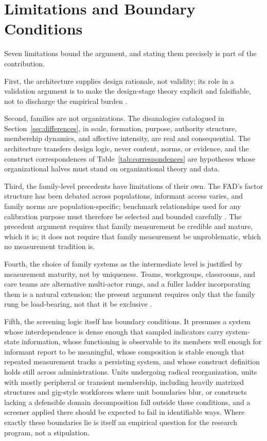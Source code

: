 \documentclass[12pt, letterpaper]{article}
\begin{document}
\section{Limitations and Boundary Conditions}
\label{sec:limitations}

Seven limitations bound the argument, and stating them precisely is part of the contribution.

First, the architecture supplies design rationale, not validity; its role in a validation argument is to make the design-stage theory explicit and falsifiable, not to discharge the empirical burden \parencite{kane2006,aera2014}.

Second, families are not organizations. The disanalogies catalogued in Section~\ref{sec:differences}, in scale, formation, purpose, authority structure, membership dynamics, and affective intensity, are real and consequential. The architecture transfers design logic, never content, norms, or evidence, and the construct correspondences of Table~\ref{tab:correspondences} are hypotheses whose organizational halves must stand on organizational theory and data.

Third, the family-level precedents have limitations of their own. The FAD's factor structure has been debated across populations, informant access varies, and family norms are population-specific; benchmark relationships used for any calibration purpose must therefore be selected and bounded carefully \parencite{hamilton2016,boterhovendehaan2015}. The precedent argument requires that family measurement be credible and mature, which it is; it does not require that family measurement be unproblematic, which no measurement tradition is.

Fourth, the choice of family systems as the intermediate level is justified by measurement maturity, not by uniqueness. Teams, workgroups, classrooms, and care teams are alternative multi-actor rungs, and a fuller ladder incorporating them is a natural extension; the present argument requires only that the family rung be load-bearing, not that it be exclusive \parencite{wageman2005}.

Fifth, the screening logic itself has boundary conditions. It presumes a system whose interdependence is dense enough that sampled indicators carry system-state information, whose functioning is observable to its members well enough for informant report to be meaningful, whose composition is stable enough that repeated measurement tracks a persisting system, and whose construct definition holds still across administrations. Units undergoing radical reorganization, units with mostly peripheral or transient membership, including heavily matrixed structures and gig-style workforces where unit boundaries blur, or constructs lacking a defensible domain decomposition fall outside these conditions, and a screener applied there should be expected to fail in identifiable ways. Where exactly these boundaries lie is itself an empirical question for the research program, not a stipulation.
\end{document}
